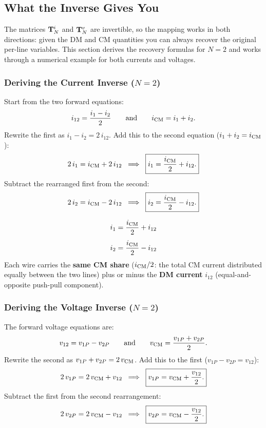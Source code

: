\subsection{What the Inverse Gives You}

The matrices $\mathbf{T}^{i}_{N}$ and $\mathbf{T}^{v}_{N}$ are invertible, so the mapping works
in both directions: given the DM and CM quantities you can always
recover the original per-line variables.  This section derives the
recovery formulas for $N = 2$ and works through a numerical example
for both currents and voltages.

\subsubsection*{Deriving the Current Inverse ($N = 2$)}

Start from the two forward equations:
\[
    i_{12} = \frac{i_1 - i_2}{2}
    \qquad\text{and}\qquad
    i_{\mathrm{CM}}   = i_1 + i_2.
\]
Rewrite the first as $i_1 - i_2 = 2\,i_{12}$.
Add this to the second equation ($i_1 + i_2 = i_{\mathrm{CM}}$):
\[
    2\,i_1 = i_{\mathrm{CM}} + 2\,i_{12}
    \;\;\Longrightarrow\;\;
    \boxed{i_1 = \frac{i_{\mathrm{CM}}}{2} + i_{12}.}
\]
Subtract the rearranged first from the second:
\[
    2\,i_2 = i_{\mathrm{CM}} - 2\,i_{12}
    \;\;\Longrightarrow\;\;
    \boxed{i_2 = \frac{i_{\mathrm{CM}}}{2} - i_{12}.}
\]

\begin{eqnbox}[Recovering Line Currents from DM and CM ($N = 2$)]
\begin{align}
    i_1 &= \frac{i_{\mathrm{CM}}}{2} + i_{12} \label{eq:inv_i1} \\[4pt]
    i_2 &= \frac{i_{\mathrm{CM}}}{2} - i_{12} \label{eq:inv_i2}
\end{align}
Each wire carries the \textbf{same CM share} ($i_{\mathrm{CM}}/2$: the total CM
current distributed equally between the two lines) plus or minus the
\textbf{DM current} $i_{12}$ (equal-and-opposite push-pull component).
\end{eqnbox}

\subsubsection*{Deriving the Voltage Inverse ($N = 2$)}

The forward voltage equations are:
\[
    v_{12} = v_{1P} - v_{2P}
    \qquad\text{and}\qquad
    v_{\mathrm{CM}}   = \frac{v_{1P} + v_{2P}}{2}.
\]
Rewrite the second as $v_{1P} + v_{2P} = 2\,v_{\mathrm{CM}}$.
Add this to the first ($v_{1P} - v_{2P} = v_{12}$):
\[
    2\,v_{1P} = 2\,v_{\mathrm{CM}} + v_{12}
    \;\;\Longrightarrow\;\;
    \boxed{v_{1P} = v_{\mathrm{CM}} + \frac{v_{12}}{2}.}
\]
Subtract the first from the second rearrangement:
\[
    2\,v_{2P} = 2\,v_{\mathrm{CM}} - v_{12}
    \;\;\Longrightarrow\;\;
    \boxed{v_{2P} = v_{\mathrm{CM}} - \frac{v_{12}}{2}.}
\]

